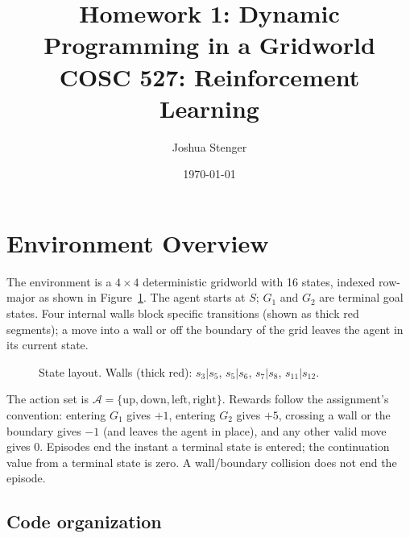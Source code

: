 \documentclass[11pt]{article}
\title{Homework 1: Dynamic Programming in a Gridworld\\
\large COSC 527: Reinforcement Learning}
\author{Joshua Stenger}
\date{\today}
\begin{document}
\maketitle

\section{Environment Overview}

The environment is a $4\times4$ deterministic gridworld with 16 states, indexed
row-major as shown in Figure~\ref{fig:layout}. The agent starts at $S$; $G_1$ and
$G_2$ are terminal goal states. Four internal walls block specific transitions
(shown as thick red segments); a move into a wall or off the boundary of the
grid leaves the agent in its current state.

\begin{figure}[h]
\centering
{}
\caption{State layout. Walls (thick red): $s_3|s_5$, $s_5|s_6$, $s_7|s_8$, $s_{11}|s_{12}$.}
\label{fig:layout}
\end{figure}

The action set is $\mathcal{A} = \{\text{up},\text{down},\text{left},\text{right}\}$.
Rewards follow the assignment's convention: entering $G_1$ gives $+1$, entering
$G_2$ gives $+5$, crossing a wall or the boundary gives $-1$ (and leaves the
agent in place), and any other valid move gives $0$. Episodes end the instant a
terminal state is entered; the continuation value from a terminal state is
zero. A wall/boundary collision does not end the episode.

\subsection{Code organization}
\end{document}
